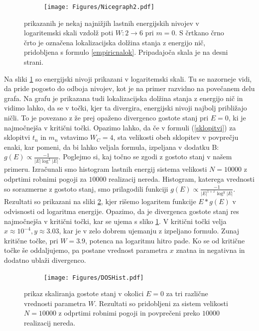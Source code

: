 \begin{figure}[!h]
\centering
\begin{subfigure}{\textwidth}
\texttt{[image: Figures/Nicegraph2.pdf]}
\end{subfigure}
\caption{prikazanih je nekaj najnižjih lastnih energijskih nivojev v logaritemski skali vzdolž poti $W: 2 \to 6$ pri $m=0$. S črtkano črno črto je označena lokalizacijska dolžina stanja z energijo nič, pridobljena s formulo \ref{empiricnalok}. Pripadajoča skala je na desni strani.}
\label{fig:Nicegraph2}
\end{figure}
Na sliki \ref{fig:Nicegraph2} so energijski nivoji prikazani v logaritemski skali. Tu se nazorneje vidi, da pride pogosto do odboja nivojev, kot je na primer razvidno na povečanem delu grafa.
Na grafu je prikazana tudi lokalizacijska dolžina stanja z energijo nič in vidimo lahko, da se v točki, kjer ta divergira, energijski nivoji najbolj približajo ničli. To je povezano z že prej opaženo divergenco gostote stanj pri $E=0$, ki je najmočnejša v kritični točki. 
Opazimo lahko, da če v formuli (\ref{sklopitvi}) za sklopitvi $t_n$ in $m_n$ vstavimo $W_C=4$,  sta velikosti obeh sklopitev v povprečju enaki, kar pomeni, da bi lahko veljala formula, izpeljana v dodatku B: $g(E) \propto \frac{-1}{|E| \log^3 |E|}$.
Poglejmo si, kaj točno se zgodi z gostoto stanj v našem primeru. Izračunali smo histogram lastnih energij sistema velikosti $N=10000$ z odprtimi robnimi pogoji za $10000$ realizacij nereda. Histogram, katerega vrednosti so sorazmerne z gostoto stanj, smo prilagodili funkciji $g(E) \propto \frac{-1}{|E|^{1+x} \log^y |E|}$. Rezultati so prikazani na sliki \ref{fig:dos}, kjer rišemo logaritem funkcije $E*g(E)$ v odvisnosti od logaritma energije. Opazimo, da je divergenca gostote stanj res najmočnejša v kritični točki, kar se ujema s sliko \ref{fig:Nicegraph2}. V kritični točki velja $x \approx 10^{-4}, y \approx 3.03$, kar je v zelo dobrem ujemanju z izpeljano formulo. Zunaj kritične točke, pri $W=3.9$, potenca na logaritmu hitro pade. Ko se od kritične točke še oddaljujemo, pa postane vrednost parametra $x$ znatna in negativna in dodatno ublaži divergenco.
\begin{figure}[!h]
\centering
\begin{subfigure}{.9\textwidth}
\texttt{[image: Figures/DOSHist.pdf]}
\end{subfigure}
\caption{prikaz skaliranja gostote stanj v okolici $E=0$ za tri različne vrednosti parametra $W$. Rezultati so pridobljeni za sistem velikosti $N=10000$ z odprtimi robnimi pogoji in povprečeni preko $10000$ realizacij nereda.}
\label{fig:dos}
\end{figure} \newpage
